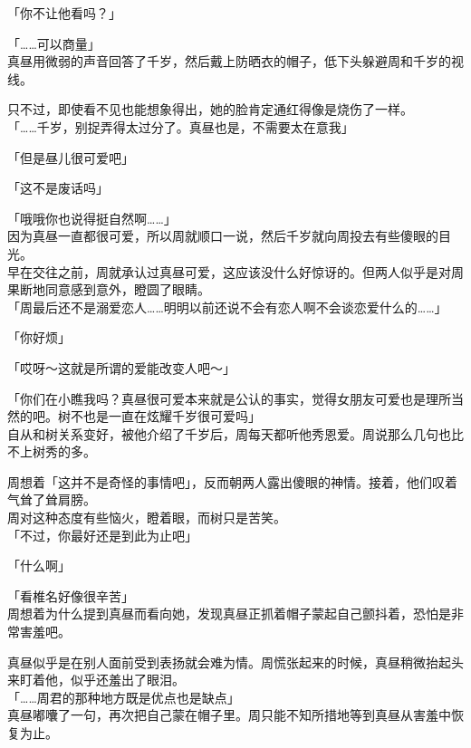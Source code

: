 「你不让他看吗？」

「……可以商量」\\

真昼用微弱的声音回答了千岁，然后戴上防晒衣的帽子，低下头躲避周和千岁的视线。

只不过，即使看不见也能想象得出，她的脸肯定通红得像是烧伤了一样。\\

「……千岁，别捉弄得太过分了。真昼也是，不需要太在意我」

「但是昼儿很可爱吧」

「这不是废话吗」

「哦哦你也说得挺自然啊……」\\

因为真昼一直都很可爱，所以周就顺口一说，然后千岁就向周投去有些傻眼的目光。\\

早在交往之前，周就承认过真昼可爱，这应该没什么好惊讶的。但两人似乎是对周果断地同意感到意外，瞪圆了眼睛。\\

「周最后还不是溺爱恋人……明明以前还说不会有恋人啊不会谈恋爱什么的……」

「你好烦」

「哎呀～这就是所谓的爱能改变人吧～」

「你们在小瞧我吗？真昼很可爱本来就是公认的事实，觉得女朋友可爱也是理所当然的吧。树不也是一直在炫耀千岁很可爱吗」\\

自从和树关系变好，被他介绍了千岁后，周每天都听他秀恩爱。周说那么几句也比不上树秀的多。

周想着「这并不是奇怪的事情吧」，反而朝两人露出傻眼的神情。接着，他们叹着气耸了耸肩膀。\\

周对这种态度有些恼火，瞪着眼，而树只是苦笑。\\

「不过，你最好还是到此为止吧」

「什么啊」

「看椎名好像很辛苦」\\

周想着为什么提到真昼而看向她，发现真昼正抓着帽子蒙起自己颤抖着，恐怕是非常害羞吧。

真昼似乎是在别人面前受到表扬就会难为情。周慌张起来的时候，真昼稍微抬起头来盯着他，似乎还羞出了眼泪。\\

「……周君的那种地方既是优点也是缺点」\\

真昼嘟囔了一句，再次把自己蒙在帽子里。周只能不知所措地等到真昼从害羞中恢复为止。

